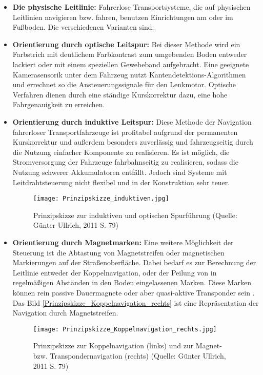 \begin{itemize}
\item \textbf{Die physische Leitlinie:}  Fahrerlose Transportsysteme, die auf physischen Leitlinien navigieren bzw. 
fahren, benutzen Einrichtungen am oder im Fu\ss boden. Die verschiedenen Varianten sind:
\item \textbf{Orientierung durch optische Leitspur:} Bei dieser Methode wird ein Farbstrich mit deutlichem Farbkontrast 
zum umgebenden Boden entweder lackiert oder mit einem speziellen Gewebeband aufgebracht.
Eine geeignete Kamerasensorik unter dem Fahrzeug nutzt Kantendetektions-Algorithmen und errechnet so die Ansteuerungssignale 
f\"ur den Lenkmotor\cite[vgl.][S. 112]{Guenther:2011}.
Optische Verfahren dienen durch eine st\"andige Kurskorrektur dazu, eine hohe Fahrgenauigkeit zu erreichen. 
\item \textbf{Orientierung durch induktive Leitspur:} Diese Methode der Navigation fahrerloser Transportfahrzeuge 
ist profitabel aufgrund der permanenten Kurskorrektur und au\ss erdem besonders zuverl\"assig und fahrzeugseitig 
durch die Nutzung einfacher Komponente zu realisieren.
Es ist m\"oglich, die Stromversorgung der Fahrzeuge fahrbahnseitig zu realisieren, sodass die Nutzung schwerer Akkumulatoren entf\"allt.
Jedoch sind Systeme mit Leitdrahtsteuerung nicht flexibel und in der Konstruktion sehr teuer.
\begin{figure}[h!]
	\centering
		\texttt{[image: Prinzipskizze\_induktiven.jpg]}
	\caption{Prinzipskizze zur induktiven und optischen Spurf\"uhrung (Quelle: G\"unter Ullrich, 2011 S. 79)}
	\label{Prinzipskizze_induktiven}
\end{figure}  
	\item \textbf{Orientierung durch Magnetmarken:} Eine weitere M\"oglichkeit der Steuerung ist die Abtastung von
	Magnetstreifen oder magnetischen Markierungen auf der Straßenoberfl\"ache.
Dabei bedarf es zur Berechnung der Leitlinie entweder der Koppelnavigation, oder der Peilung von in regelm\"a\ss igen Abst\"anden in den Boden eingelassenen Marken.
Diese Marken k\"onnen rein passive Dauermagnete oder aber quasi-aktive Transponder sein \cite[vgl.][S. 80]{Guenther:2011}.
Das Bild \ref{Prinzipskizze_Koppelnavigation_rechts} ist eine Repr\"asentation der Navigation durch Magnetstreifen.
	\begin{figure}[h!]
		\centering
			\texttt{[image: Prinzipskizze\_Koppelnavigation\_rechts.jpg]}
			\caption{Prinzipskizze zur Koppelnavigation (links) und zur Magnet- bzw. Transpondernavigation (rechts) (Quelle: G\"unter Ullrich, 2011 S. 79)}

\end{figure}
\end{itemize}
